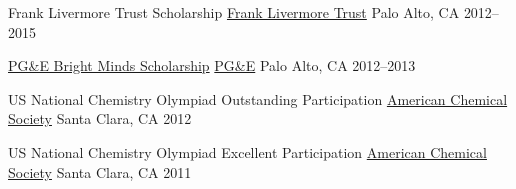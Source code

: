 \begin{cvhonors}
	\cvhonor
		{Frank Livermore Trust Scholarship} %
		{\href{https://www.paloaltoonline.com/weekly/morgue/community_pulse/2000_Jun_21.OBITLEAD.html}{Frank Livermore Trust}} %
		{Palo Alto, CA} %
		{2012--2015} %
	
	\cvhonor
		{\href{https://www.pge.com/en_US/residential/in-your-community/education-programs/grants-and-scholarships/bright-mind-scholarships/bright-mind-scholarships.page}{PG\&E Bright Minds Scholarship}} %
		{\href{https://www.pge.com}{PG\&E}} %
		{Palo Alto, CA} %
		{2012--2013} %

\end{cvhonors}


\begin{cvhonors}

	\cvhonor
    	{US National Chemistry Olympiad Outstanding Participation} %
		{\href{https://www.acs.org/content/acs/en/education/students/highschool/olympiad.html}{American Chemical Society}} %
		{Santa Clara, CA} %
		{2012} %

	\cvhonor
		{US National Chemistry Olympiad Excellent Participation} %
		{\href{https://www.acs.org/content/acs/en/education/students/highschool/olympiad.html}{American Chemical Society}} %
		{Santa Clara, CA} %
		{2011} %

\end{cvhonors}



